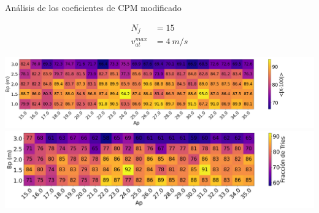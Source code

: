 \begin{frame}{Análisis de los coeficientes de CPM modificado}
    \begin{center}
        \begin{minipage}[c]{0.15\textwidth}
            \begin{equation*}
                \begin{aligned}
                    N_j &= 15 \\
                    v_{at}^{max} &= 4\ m/s
                \end{aligned}
            \end{equation*}
        \end{minipage}
        \hfill
        \begin{minipage}[c]{0.75\textwidth}
            \includegraphics[width=1.1\textwidth]{pic/05-resultados/r3}
            \includegraphics[width=1.1\textwidth]{pic/05-resultados/r4}
        \end{minipage}
    \end{center}
    \vfill
    \footnotesize{}
\end{frame}


